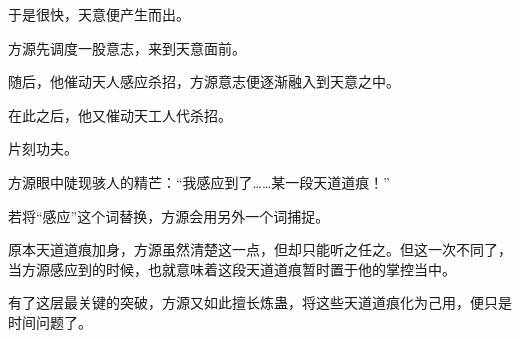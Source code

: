 \begin{this_body}
于是很快，天意便产生而出。

方源先调度一股意志，来到天意面前。

随后，他催动天人感应杀招，方源意志便逐渐融入到天意之中。

在此之后，他又催动天工人代杀招。

片刻功夫。

方源眼中陡现骇人的精芒：“我感应到了……某一段天道道痕！”

若将“感应”这个词替换，方源会用另外一个词捕捉。

原本天道道痕加身，方源虽然清楚这一点，但却只能听之任之。但这一次不同了，当方源感应到的时候，也就意味着这段天道道痕暂时置于他的掌控当中。

有了这层最关键的突破，方源又如此擅长炼蛊，将这些天道道痕化为己用，便只是时间问题了。

\end{this_body}

